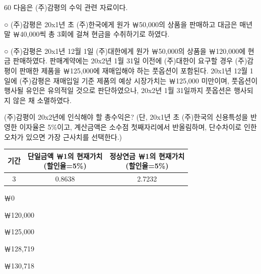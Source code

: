 \begin{question}{60}
다음은 (주)감평의 수익 관련 자료이다.
\begin{framedtext}
○ (주)감평은 20x1년 초 (주)한국에게 원가 ￦50,000의 상품을 판매하고 대금은 매년 말 ￦40,000씩 총 3회에 걸쳐 현금을 수취하기로 하였다. \par
○ (주)감평은 20x1년 12월 1일 (주)대한에게 원가 ￦50,000의 상품을 ￦120,000에 현금 판매하였다. 판매계약에는 20x2년 1월 31일 이전에 (주)대한이 요구할 경우 (주)감평이 판매한 제품을 ￦125,000에 재매입해야 하는 풋옵션이 포함된다. 20x1년 12월 1일에 (주)감평은 재매입일 기준 제품의 예상 시장가치는 ￦125,000 미만이며, 풋옵션이 행사될 유인은 유의적일 것으로 판단하였으나, 20x2년 1월 31일까지 풋옵션은 행사되지 않은 채 소멸하였다. \par
\end{framedtext}
(주)감평이 20x2년에 인식해야 할 총수익은? (단, 20x1년 초 (주)한국의 신용특성을 반영한 이자율은 5\%이고, 계산금액은 소수점 첫째자리에서 반올림하며, 단수차이로 인한 오차가 있으면 가장 근사치를 선택한다.)
\par{\small\centering\begin{tabular}{|c|c|c|}\hline
기간 & \makecell{단일금액 ￦1의 현재가치\\(할인율=5\%)} & \makecell{정상연금 ￦1의 현재가치\\(할인율=5\%)} \\ \hline
3 & 0.8638 & 2.7232 \\ \hline
\end{tabular}\par}
\begin{choices}
  \item ￦0
  \item ￦120,000
  \item ￦125,000
  \item ￦128,719
  \item ￦130,718
\end{choices}
\end{question}
